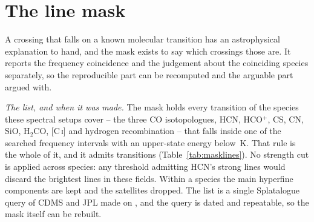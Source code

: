 \section{The line mask}
\label{app:linemask}

A crossing that falls on a known molecular transition has an astrophysical
explanation to hand, and the mask exists to say which crossings those are. It
reports the frequency coincidence and the judgement about the coinciding
species separately, so the reproducible part can be recomputed and the
arguable part argued with.

\emph{The list, and when it was made.} The mask holds every transition of the
\FrNSpec{} species these spectral setups cover -- the three CO isotopologues,
HCN, HCO$^{+}$, CS, CN, SiO, H$_2$CO, [C\,\textsc{i}] and hydrogen
recombination -- that falls inside one of the \McNIsland{} searched frequency
intervals with an upper-state energy below \McEuMax\,K. That rule is the whole
of it, and it admits \FrNTrans{} transitions (Table~\ref{tab:masklines}).
No strength cut is applied across species: any threshold admitting HCN's
strong lines would discard the brightest lines in these fields. Within a
species the main hyperfine components are kept and the satellites
dropped. The list is a single Splatalogue query
\citep{Splatalogue2007} of CDMS and JPL \citep{Pickett1998,CDMS2005} made on
\MkListDate{}, and the query is dated and repeatable, so the mask itself can
be rebuilt.

